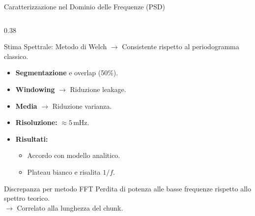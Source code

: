 \documentclass[10pt, aspectratio=169, handout]{beamer}
\begin{document}
\begin{frame}{Caratterizzazione nel Dominio delle Frequenze (PSD)}

  \begin{columns}[c]
    
    \begin{column}{0.38\textwidth}
      
      \begin{block}{Stima Spettrale: Metodo di Welch}
        \scriptsize
        $\rightarrow$ Consistente rispetto al periodogramma classico.
        \begin{itemize}
          \item \textbf{Segmentazione} e overlap (50\%).
          \item \textbf{Windowing} $\rightarrow$ Riduzione leakage.
          \item \textbf{Media} $\rightarrow$ Riduzione varianza.
          \item \textbf{Risoluzione:} $\approx 5$\,mHz.
        \end{itemize}
      \end{block}

      \vspace{0.1cm}

      \begin{itemize}
        \item \footnotesize \textbf{Risultati:}
          \begin{itemize}
            \item \scriptsize Accordo con modello analitico.
            \item \scriptsize Plateau bianco e risalita $1/f$.
          \end{itemize}
        \end{itemize}

    \vspace{0.2cm}

  \begin{alertblock}{Discrepanza per metodo FFT}
    \fontsize{6pt}{7pt}\selectfont
    Perdita di potenza alle basse frequenze rispetto allo spettro teorico. \\ 
    $\rightarrow$ Correlato alla lunghezza del chunk.
  \end{alertblock}
    

\end{column}
\end{columns}
\end{frame}
\end{document}
